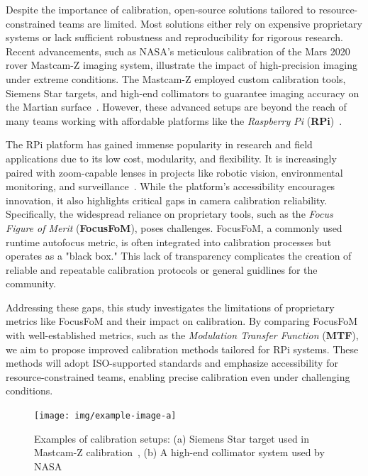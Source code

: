 \documentclass[main]{subfiles}
\begin{document}
  Despite the importance of calibration, open-source solutions tailored to resource-constrained teams are limited. Most solutions either rely on expensive proprietary systems or lack sufficient robustness and reproducibility for rigorous research. Recent advancements, such as NASA's meticulous calibration of the Mars 2020 rover Mastcam-Z imaging system, illustrate the impact of high-precision imaging under extreme conditions. The Mastcam-Z employed custom calibration tools, Siemens Star targets, and high-end collimators to guarantee imaging accuracy on the Martian surface~\cite{Hayes2021}. However, these advanced setups are beyond the reach of many teams working with affordable platforms like the \textit{Raspberry Pi} (\textbf{RPi})~\cite{OpenHardware, RaspberryPi_application_review_2024}.

  The RPi platform has gained immense popularity in research and field applications due to its low cost, modularity, and flexibility. It is increasingly paired with zoom-capable lenses in projects like robotic vision, environmental monitoring, and surveillance~\cite{OpenHardware}. While the platform’s accessibility encourages innovation, it also highlights critical gaps in camera calibration reliability. Specifically, the widespread reliance on proprietary tools, such as the \textit{Focus Figure of Merit} (\textbf{FocusFoM}), poses challenges. FocusFoM, a commonly used runtime autofocus metric, is often integrated into calibration processes but operates as a "black box." This lack of transparency complicates the creation of reliable and repeatable calibration protocols or general guidlines for the community.

  Addressing these gaps, this study investigates the limitations of proprietary metrics like FocusFoM and their impact on calibration. By comparing FocusFoM with well-established metrics, such as the \textit{Modulation Transfer Function} (\textbf{MTF})\cite{ISO_12233_Evolution}, we aim to propose improved calibration methods tailored for RPi systems. These methods will adopt ISO-supported standards and emphasize accessibility for resource-constrained teams, enabling precise calibration even under challenging conditions\cite{ALARURI20165820, Bowman2020FlatField, OpenHardware}.

  \begin{figure}[ht]
      \centering
      \texttt{[image: img/example-image-a]} %
      \caption{
        Examples of calibration setups:
      (a) Siemens Star target used in Mastcam-Z calibration~\cite{ISO_12233_Evolution},
      (b) A high-end collimator system used by NASA
      }
      \label{fig:calibration_collage}
  \end{figure}
\end{document}
